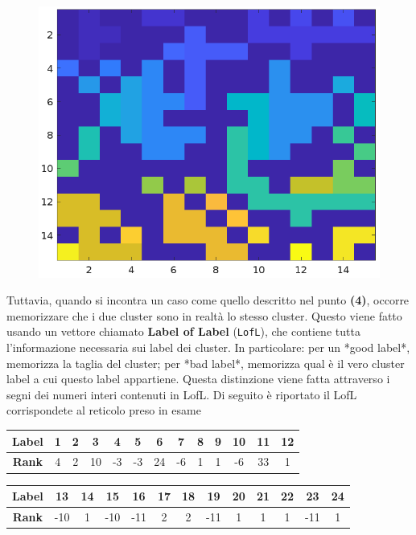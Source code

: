 \begin{figure}[H]
\begin{minipage}{0.45\textwidth}
		\includegraphics[width=\linewidth]{images/labels}
		\label{fig:basegrid}
	\end{minipage}
\end{figure}
\noindent
Tuttavia, quando si incontra un caso come quello descritto nel punto \textbf{(4)}, occorre  memorizzare che i due cluster sono in realtà lo stesso cluster. Questo viene fatto usando un vettore chiamato \textbf{Label of Label} (\texttt{LofL}), che contiene tutta l’informazione necessaria sui label dei cluster. In particolare: 
per un *good label*, memorizza la taglia del cluster; 
per *bad label*, memorizza qual è il vero cluster label a cui questo label appartiene.  Questa distinzione viene fatta attraverso i segni dei numeri interi contenuti in LofL. Di seguito è riportato il LofL corrispondete al reticolo preso in esame

\vspace{15px}
\noindent
\begin{tabular}{|c|*{12}{c|}}
	\hline
	\textbf{Label} & 1 & 2 & 3 & 4 & 5 & 6 & 7 & 8 & 9 & 10 & 11 & 12 \\
	\hline
	\textbf{Rank} & 4 & 2 & 10 & -3 & -3 & 24 & -6 & 1 & 1 & -6 & 33 & 1 \\
	\hline
\end{tabular}

\vspace{10px}
\noindent
\begin{tabular}{|c|*{12}{c|}}
	\hline
	\textbf{Label} & 13 & 14 & 15 & 16 & 17 & 18 & 19 & 20 & 21 & 22 & 23 & 24 \\
	\hline
	\textbf{Rank} & -10 & 1 & -10 & -11 & 2 & 2 & -11 & 1 & 1 & 1 & -11 & 1 \\
	\hline
\end{tabular}

